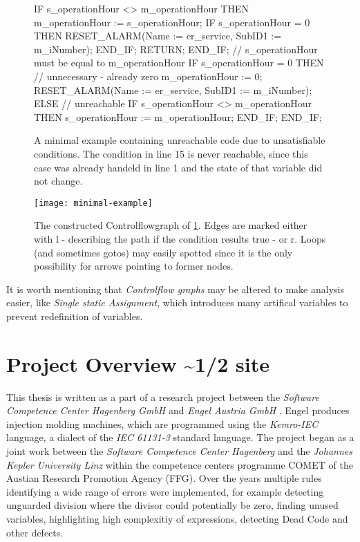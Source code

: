 \begin{figure}
    \begin{GenericCode}
    IF s_operationHour <> m_operationHour THEN
        m_operationHour := s_operationHour;
        IF s_operationHour = 0 THEN
            RESET_ALARM(Name := er_service, SubID1 := m_iNumber);
        END_IF;
        RETURN;
    END_IF;
    // s_operationHour must be equal to m_operationHour
    IF s_operationHour = 0 THEN
        // unnecessary - already zero
        m_operationHour := 0;
        RESET_ALARM(Name := er_service, SubID1 := m_iNumber);
    ELSE
        // unreachable
        IF s_operationHour <> m_operationHour THEN
            s_operationHour := m_operationHour;
        END_IF;
    END_IF;
    \end{GenericCode}
    \caption{A minimal example containing unreachable code due to unsatisfiable conditions. The condition in line 15 is never reachable, since this case was already handeld in line 1 and the state of that variable did not change.}
    \label{code:ex1}
\end{figure}
\begin{figure}
  \centering
  \texttt{[image: minimal-example]}
  \caption{The constructed Controlflowgraph of \ref{code:ex1}. Edges are marked either with l - describing the path if the condition results true - or r. Loops (and sometimes gotos) may easily spotted since it is the only possibility for arrows pointing to former nodes.}
  \label{fig:cfg}
\end{figure}

It is worth mentioning that \emph{Controlflow graphs} may be altered to make analysis easier, like \emph {Single static Assignment}, which introduces many artifical variables to prevent redefinition of variables.

\section{Project Overview \textasciitilde 1/2 site}
This thesis is written as a part of a research project between the \emph{Software Competence Center Hagenberg GmbH} \cite{ScchGmbH} and \emph{Engel Austria GmbH} \cite{EngelGmbH}.
Engel produces injection molding machines, which are programmed using the \emph{Kemro-IEC} language, a dialect of the \emph{IEC 61131-3} standard language.
The project began as a joint work between the \emph{Software Competence Center Hagenberg} and the \emph{Johannes Kepler University Linz}  within the competence centers programme COMET of the Austian Research Promotion Agency (FFG).
Over the years multiple rules identifying a wide range of errors were implemented, for example detecting unguarded division where the divisor could potentially be zero, finding unused variables, highlighting high complexitiy of expressions, detecting Dead Code and other defects.

